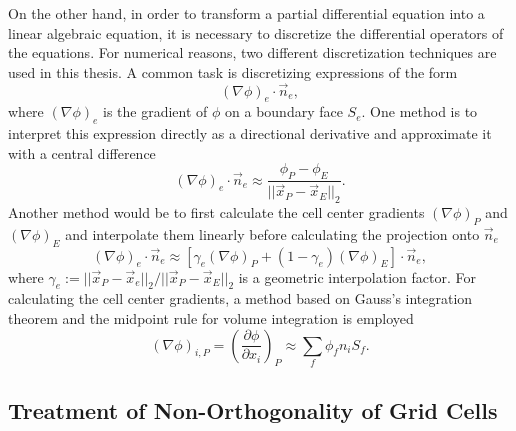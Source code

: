 On the other hand, in order to transform a partial differential equation into a linear algebraic equation, it is necessary to discretize the differential operators of the equations. For numerical reasons, two different discretization techniques are used in this thesis. A common task is discretizing expressions of the form
\begin{displaymath}
  \left(\nabla \phi\right)_e \cdot \vec{n}_e,
\end{displaymath}
where \(\left(\nabla \phi\right)_e\) is the gradient of \(\phi\) on a boundary face \(S_e\). One method is to interpret this expression directly as a directional derivative and approximate it with a central difference
\begin{equation}
  \label{eq:cds}
  \left(\nabla \phi\right)_e \cdot \vec{n}_e \approx \frac{\phi_P - \phi_E}{|| \vec{x}_P - \vec{x}_E ||_2}.
\end{equation}
Another method would be to first calculate the cell center gradients \(\left(\nabla \phi \right)_P\) and \(\left(\nabla \phi \right)_E\) and interpolate them linearly before calculating the projection onto \(\vec{n}_e\)
\begin{equation}
  \label{eq:interpolgrad}
  \left(\nabla \phi\right)_e \cdot \vec{n}_e 
  \approx 
  \left[\gamma_e \left(\nabla \phi \right)_P + (1-\gamma_e) \left(\nabla \phi \right)_E \right] \cdot \vec{n}_e,
\end{equation}
where \( \gamma_e := {||\vec{x}_P - \vec{x}_e||_2}/{||\vec{x}_P - \vec{x}_E||_2}\) is a geometric interpolation factor. For calculating the cell center gradients, a method based on Gauss's integration theorem and the midpoint rule for volume integration is employed
\begin{equation}
  \label{eq:gaussgrad}
  \left( \nabla \phi \right)_{i,P}
  =
  \left( \frac{\partial \phi}{\partial x_i}\right)_P
  \approx
  \sum_f \phi_f n_i S_f.
\end{equation}

\subsection{Treatment of Non-Orthogonality of Grid Cells}
\label{sec:nonorth}


